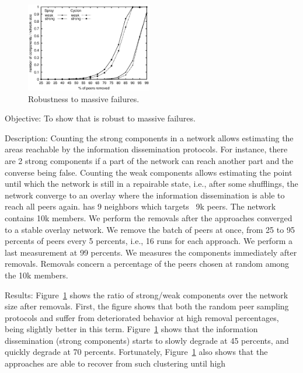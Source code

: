 \begin{figure}
  \centering
  \includegraphics[width=0.49\textwidth]{img/resilience.eps}
  \caption{\label{fig:resilience}Robustness to massive failures.}
\end{figure}

\begin{asparadesc}
\item[Objective:] To show that \SPRAY is robust to massive failures.
\item[Description:] Counting the strong components in a network allows
  estimating the areas reachable by the information dissemination protocols. For
  instance, there are 2 strong components if a part of the network can reach
  another part and the converse being false.  Counting the weak components
  allows estimating the point until which the network is still in a repairable
  state, i.e., after some shufflings, the network converge to an overlay where
  the information dissemination is able to reach all peers again. \CYCLON has 9
  neighbors which targets ~9k peers. The network contains 10k members. We
  perform the removals after the approaches converged to a stable overlay
  network. We remove the batch of peers at once, from 25 to 95 percents of peers
  every 5 percents, i.e., 16 runs for each approach. We perform a last
  measurement at 99 percents. We measures the components immediately after
  removals. Removals concern a percentage of the peers chosen at random among
  the 10k members.
\item[Results:] Figure~\ref{fig:resilience} shows the ratio of strong/weak
  components over the network size after removals. First, the figure shows that
  both the random peer sampling protocols \SPRAY and \CYCLON suffer from
  deteriorated behavior at high removal percentages, \CYCLON being slightly
  better in this term. Figure~\ref{fig:resilience} shows that the information
  dissemination (strong components) starts to slowly degrade at 45 percents, and
  quickly degrade at 70 percents. Fortunately, Figure~\ref{fig:resilience} also
  shows that the approaches are able to recover from such clustering until high

\end{asparadesc}
